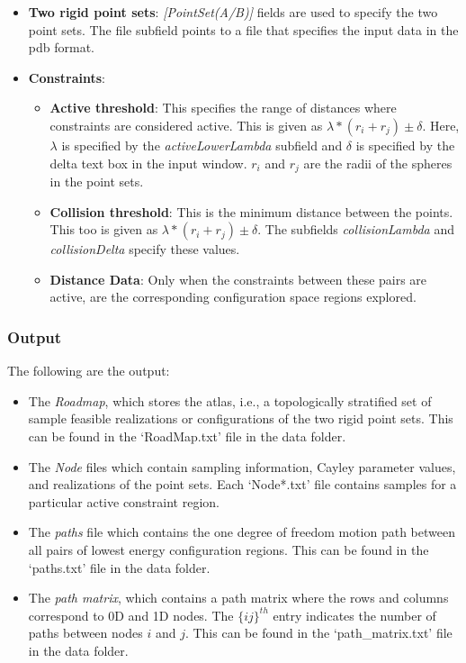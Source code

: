 \documentclass[10pt]{article}
\begin{document}
\begin{itemize}
\item \textbf{Two rigid point sets}: \emph{[PointSet(A/B)]} 
fields are used to specify the two point sets. The file subfield
points to a file that specifies the input data in the pdb format.
		

\item \textbf{Constraints}:
\begin{itemize}
\item \textbf{Active threshold}: This specifies the range of distances where constraints are considered active.
This is given as $\lambda*(r_i+r_j) \pm \delta$. 
Here, $\lambda$ is specified by the \emph{activeLowerLambda} subfield 
and $\delta$ is specified by the delta text box in the
input window. $r_i$ and $r_j$ are the radii of the spheres in the point sets. 

\item \textbf{Collision threshold}: This is the minimum distance between the points. This too is given as
$\lambda*(r_i+r_j) \pm \delta$. 
The subfields \emph{collisionLambda} and \emph{collisionDelta} specify these values.

\item \textbf{Distance Data}: Only when the constraints between these pairs are active, are the corresponding
configuration space regions explored.

\end{itemize}
\end{itemize}

\subsubsection{Output}

The following are the output:
\begin{itemize}
\item The \emph{Roadmap}, which stores the atlas, i.e., a topologically stratified set of sample feasible realizations
or configurations of the two rigid point sets. This can be found in the `RoadMap.txt' file in the data
folder.

\item The \emph{Node} files which contain sampling information, Cayley parameter values, and realizations of the
point sets. Each `Node*.txt' file contains samples for a particular active constraint region.

\item The \emph{paths} file which contains the one degree of freedom motion path between all pairs of lowest energy
configuration regions. This can be found in the `paths.txt' file in the data folder.

\item The \emph{path matrix}, which contains a path matrix where the rows and columns correspond to 0D and 1D
nodes. The $\{ij\}^{th}$ entry indicates the number of paths between nodes $i$ and $j$. This can be found in
the `path\_matrix.txt' file in the data folder.
\end{itemize}
\end{document}
